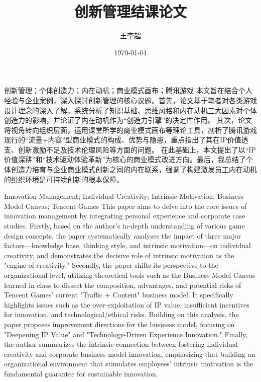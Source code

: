 \documentclass[supercite]{HustGSClassPaper}
\title{创新管理结课论文} %
\author{王李超} %
\date{\today} %
\begin{document}
	\maketitle[line length=14em]
	\clearpage %
	
	\begin{cnabstract}{创新管理；个体创造力；内在动机；商业模式画布；腾讯游戏}
	本文旨在结合个人经验与企业案例，深入探讨创新管理的核心议题。首先，论文基于笔者对各类游戏设计理念的深入了解，系统分析了知识基础、思维风格和内在动机三大因素对个体创造力的影响，并论证了内在动机作为“创造力引擎”的决定性作用。
	其次，论文将视角转向组织层面，运用课堂所学的商业模式画布等理论工具，剖析了腾讯游戏现行的“流量+内容”型商业模式的构成、优势与隐患，重点指出了其在IP价值透支、创新激励不足及技术伦理风险等方面的问题。
	在此基础上，本文提出了以“IP价值深耕”和“技术驱动体验革新”为核心的商业模式改进方向。最后，我总结了个体创造力培育与企业商业模式创新之间的内在联系，强调了构建激发员工内在动机的组织环境是可持续创新的根本保障。
	\end{cnabstract}
	\begin{enabstract}{Innovation Management; Individual Creativity; Intrinsic Motivation; Business Model Canvas; Tencent Games}
	This paper aims to delve into the core issues of innovation management by integrating personal experience and corporate case studies. 
	Firstly, based on the author's in-depth understanding of various game design concepts, the paper systematically analyzes the impact of three major factors—knowledge base, 
	thinking style, and intrinsic motivation—on individual creativity, and demonstrates the decisive role of intrinsic motivation as the "engine of creativity."
	Secondly, the paper shifts its perspective to the organizational level, 
	utilizing theoretical tools such as the Business Model Canvas learned in class to dissect the composition, advantages, and potential risks of Tencent Games' current "Traffic + Content" business model. 
	It specifically highlights issues such as the over-exploitation of IP value, insufficient incentives for innovation, and technological/ethical risks.
	Building on this analysis, the paper proposes improvement directions for the business model, focusing on "Deepening IP Value" and "Technology-Driven Experience Innovation." 
	Finally, the author summarizes the intrinsic connection between fostering individual creativity and corporate business model innovation, 
	emphasizing that building an organizational environment that stimulates employees' intrinsic motivation is the fundamental guarantee for sustainable innovation.	
	\end{enabstract}
	
\end{document}
